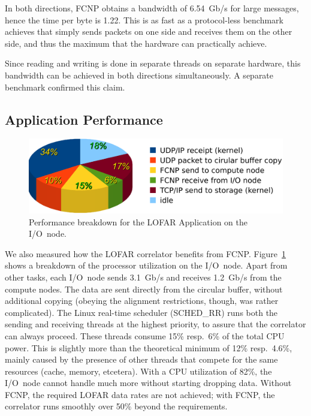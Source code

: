 \documentclass[journal]{IEEEtran}
\begin{document}
In both directions, FCNP obtains a bandwidth of 6.54~Gb/s for large messages,
hence the time per byte is 1.22\ns.
This is as fast as a protocol-less benchmark achieves that simply sends packets
on one side and receives them on the other side, and thus the maximum that
the hardware can practically achieve.

Since reading and writing is done in separate threads on separate hardware,
this bandwidth can be achieved in both directions simultaneously.
A separate benchmark confirmed this claim.




\subsection{Application Performance}

\begin{figure}[h]
\includegraphics[width=\columnwidth]{ionode-load.eps}
\caption{Performance breakdown for the LOFAR Application on the I/O~node.}
\label{fig:ionode-load}
\end{figure}

We also measured how the LOFAR correlator benefits from FCNP.
Figure~\ref{fig:ionode-load} shows a breakdown of the processor
utilization on the I/O~node.
Apart from other tasks, each I/O~node sends 3.1~Gb/s and receives 1.2~Gb/s
from the compute nodes.
The data are sent directly from the circular buffer, without additional
copying (obeying the alignment restrictions, though, was rather complicated).
The Linux real-time scheduler (SCHED\_RR) runs both the sending and receiving
threads at the highest priority, to assure that the correlator can always
proceed.
These threads consume 15\% resp.\ 6\% of the total CPU power.
This is slightly more than the theoretical minimum of 12\% resp.\ 4.6\%,
mainly caused by the presence of other threads that compete for the same
resources (cache, memory, etcetera).
With a CPU utilization of 82\%, the I/O~node cannot handle much more without
starting dropping data.
Without FCNP, the required LOFAR data rates are not achieved;
with FCNP, the correlator runs smoothly over 50\% beyond the requirements.
\end{document}
